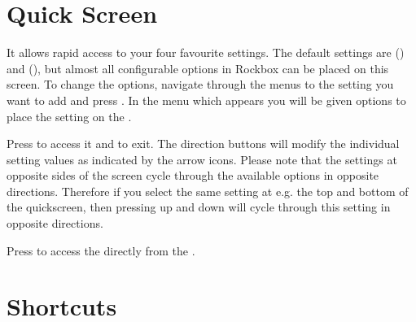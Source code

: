 {
\section{\label{ref:QuickScreen}Quick Screen}
  It allows rapid access to your four favourite settings.  The default settings are
   () and
   (), but almost all
  configurable options in Rockbox can be placed on this screen.  To change the
  options, navigate through the menus to the setting you want to add and press
  \ActionStdContext.  In the menu which appears you will be given options
  to place the setting on the .
  
  Press
   to access it and \ActionQuickScreenExit{} to exit.
  The direction buttons will modify the individual setting values as indicated 
  by the arrow icons. Please note that the settings at opposite sides of the
   screen cycle through the available options in opposite directions.
   Therefore if you select the same setting at e.g. the top and bottom of the
   quickscreen, then pressing up and down will cycle through this setting in
   opposite directions.


  Press \ActionStdContext{} to access the  directly from the
  .
}

\section{\label{ref:MainMenuShortcuts}Shortcuts}

